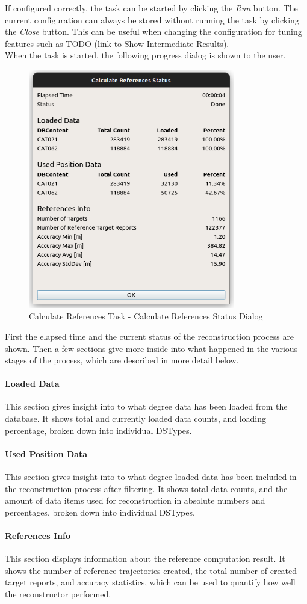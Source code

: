 If configured correctly, the task can be started by clicking the \textit{Run} button.
The current configuration can always be stored without running the task by clicking the \textit{Close} button. 
This can be useful when changing the configuration for tuning features such as TODO (link to Show Intermediate Results). \\

When the task is started, the following progress dialog is shown to the user.

\begin{figure}[H]
    \center
      \includegraphics[width=9cm]{figures/ui_task_references_dialog_result.png}
    \caption{Calculate References Task - Calculate References Status Dialog}
\end{figure}

First the elapsed time and the current status of the reconstruction process are shown.
Then a few sections give more inside into what happened in the various stages of the process, 
which are described in more detail below.

\paragraph{Loaded Data} This section gives insight into to what degree data has been loaded from
the database. It shows total and currently loaded data counts, and loading percentage, broken down into
individual DSTypes.

\paragraph{Used Position Data} This section gives insight into to what degree loaded data has been
included in the reconstruction process after filtering. 
It shows total data counts, and the amount of data items used for reconstruction in absolute numbers and percentages,
broken down into individual DSTypes.

\paragraph{References Info} This section displays information about the reference computation result.
It shows the number of reference trajectories created, the total number of created target reports, and 
accuracy statistics, which can be used to quantify how well the reconstructor performed.

